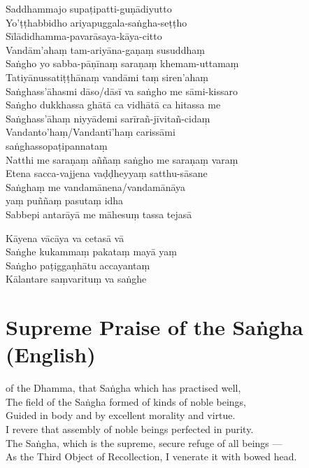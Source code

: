Saddhammajo supaṭipatti-guṇādiyutto\\
Yo'ṭṭhabbidho ariyapuggala-saṅgha-seṭṭho\\
Sīlādidhamma-pavarāsaya-kāya-citto\\
Vandām'ahaṃ tam-ariyāna-gaṇaṃ susuddhaṃ\\
Saṅgho yo sabba-pāṇīnaṃ saraṇaṃ khemam-uttamaṃ\\
Tatiyānussatiṭṭhānaṃ vandāmi taṃ siren'ahaṃ\\
Saṅghass'āhasmi dāso/dāsī va saṅgho me sāmi-kissaro\\
Saṅgho dukkhassa ghātā ca vidhātā ca hitassa me\\
Saṅghass'āhaṃ niyyādemi sarīrañ-jīvitañ-cidaṃ\\
Vandanto'haṃ/Vandantī'haṃ carissāmi\\
\vin saṅghassopaṭipannataṃ\\
Natthi me saraṇaṃ aññaṃ saṅgho me saraṇaṃ varaṃ\\
Etena sacca-vajjena vaḍḍheyyaṃ satthu-sāsane\\
Saṅghaṃ me vandamānena/vandamānāya\\
\vin yaṃ puññaṃ pasutaṃ idha\\
Sabbepi antarāyā me māhesuṃ tassa tejasā


Kāyena vācāya va cetasā vā\\
Saṅghe kukammaṃ pakataṃ mayā yaṃ\\
Saṅgho paṭiggaṇhātu accayantaṃ\\
Kālantare saṃvarituṃ va saṅghe

\section*{Supreme Praise of the Saṅgha (English)}

\begin{leader}
\end{leader}

 of the Dhamma, that Saṅgha which has practised well,\\
The field of the Saṅgha formed of  kinds of noble beings,\\
Guided in body and  by excellent morality and virtue.\\
I revere that assembly of noble beings perfected in purity.\\
The Saṅgha, which is the supreme, secure refuge of all beings ---\\
As the Third Object of Recollection, I venerate it with bowed head.

